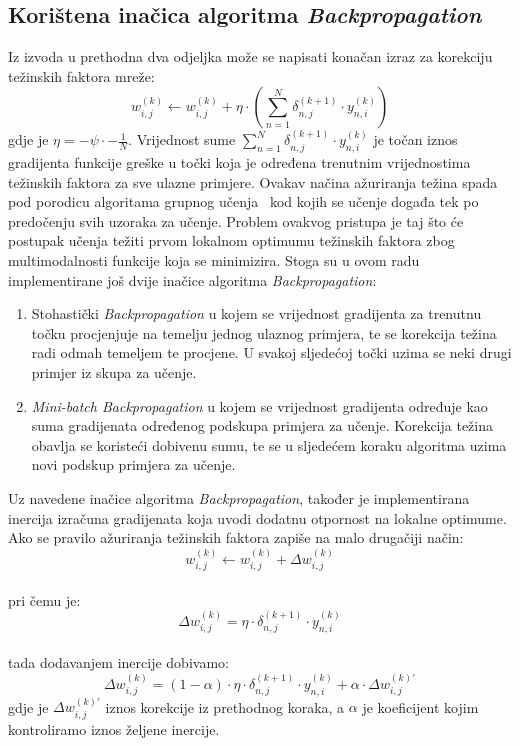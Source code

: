 \subsection{Korištena inačica algoritma \emph{Backpropagation}}
\label{subsec:koristena-inacica-algoritmaemph}
Iz izvoda u prethodna dva odjeljka može se napisati konačan izraz za korekciju težinskih faktora mreže:\\
\begin{equation*}
    w_{i, j}^{(k)} \leftarrow w_{i, j}^{(k)} + \eta \cdot \left(\sum_{n = 1}^{N} \delta_{n, j}^{(k + 1)}
    \cdot y_{n, i}^{(k)}\right)
\end{equation*}
gdje je $\eta = -\psi \cdot -\frac{1}{N}$. Vrijednost sume
$\sum_{n = 1}^{N} \delta_{n, j}^{(k + 1)} \cdot y_{n, i}^{(k)}$ je točan iznos gradijenta funkcije greške u točki koja
je određena trenutnim vrijednostima težinskih faktora za sve ulazne primjere. Ovakav načina ažuriranja težina spada pod
porodicu algoritama grupnog učenja\ \citep{cupic2013} kod kojih se učenje događa tek po predočenju svih uzoraka za
učenje. Problem ovakvog pristupa je taj što će postupak učenja težiti prvom lokalnom optimumu težinskih faktora zbog
multimodalnosti funkcije koja se minimizira. Stoga su u ovom radu implementirane još dvije inačice algoritma
\emph{Backpropagation}:
\begin{enumerate}
    \item Stohastički \emph{Backpropagation} u kojem se vrijednost gradijenta za trenutnu točku procjenjuje na temelju
    jednog ulaznog primjera, te se korekcija težina radi odmah temeljem te procjene. U svakoj sljedećoj točki uzima se
    neki drugi primjer iz skupa za učenje.
    \item \emph{Mini-batch Backpropagation} u kojem se vrijednost gradijenta određuje kao suma gradijenata određenog
    podskupa primjera za učenje. Korekcija težina obavlja se koristeći dobivenu sumu, te se u sljedećem koraku algoritma
    uzima novi podskup primjera za učenje.
\end{enumerate}
Uz navedene inačice algoritma \emph{Backpropagation}, također je implementirana inercija izračuna gradijenata koja uvodi
dodatnu otpornost na lokalne optimume. Ako se pravilo ažuriranja težinskih faktora zapiše na malo drugačiji način:\\
\begin{equation*}
    w_{i, j}^{(k)} \leftarrow w_{i, j}^{(k)} + \Delta w_{i, j}^{(k)}
\end{equation*}\\
pri čemu je:\\
\begin{equation*}
    \Delta w_{i, j}^{(k)} = \eta \cdot \delta_{n, j}^{(k + 1)} \cdot y_{n, i}^{(k)}
\end{equation*}\\
tada dodavanjem inercije dobivamo:\\
\begin{equation*}
    \Delta w_{i, j}^{(k)} = (1 - \alpha) \cdot \eta \cdot \delta_{n, j}^{(k + 1)} \cdot y_{n, i}^{(k)} +
    \alpha \cdot \Delta w_{i, j}^{(k)'}
\end{equation*}
gdje je $\Delta w_{i, j}^{(k)'}$ iznos korekcije iz prethodnog koraka, a $\alpha$ je koeficijent kojim kontroliramo
iznos željene inercije.
